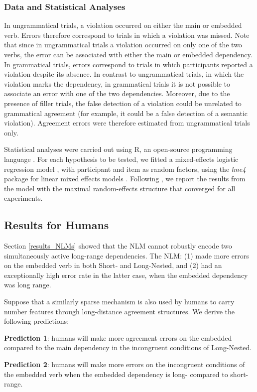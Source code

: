 \subsubsection{Data and Statistical Analyses}
In ungrammatical trials, a violation occurred on either the main or embedded verb. Errors therefore correspond to trials in which a violation was missed. Note that since in ungrammatical trials a violation occurred on only one of the two verbs, the error can be associated with either the main or embedded dependency. In grammatical trials, errors correspond to trials in which participants reported a violation despite its absence. In contrast to ungrammatical trials, in which the violation marks the dependency, in grammatical trials it is not possible to associate an error with one of the two dependencies. Moreover, due to the presence of filler trials, the false detection of a violation could be unrelated to grammatical agreement (for example, it could be a false detection of a semantic violation). Agreement errors were therefore estimated from ungrammatical trials only.

Statistical analyses were carried out using R, an open-source programming language \citep{team2013r}. For each hypothesis to be tested, we fitted a mixed-effects logistic regression model \citep{jaeger2008categorical}, with participant and item as random factors, using the \textit{lme4} package for linear mixed effects models \citep{bates2015lme4}. Following \citet{Baayen:etal:2008}, we report the results from the model with the maximal random-effects structure that converged for all experiments. 


\subsection{Results for Humans}
Section \ref{results_NLMs} showed that the NLM cannot robustly encode two simultaneously active long-range dependencies. The NLM: (1) made more errors on the embedded verb in both Short- and Long-Nested, and (2) had an exceptionally high error rate in the latter case, when the embedded dependency was long range.

Suppose that a similarly sparse mechanism is also used by humans to carry number features through long-distance agreement structures. We derive the following predictions:

\begin{APAitemize}
    \item \textbf{Prediction 1}: humans will make more agreement errors on the embedded compared to the main dependency in the incongruent conditions of Long-Nested. 
    \item \textbf{Prediction 2}: humans will make more errors on the incongruent conditions of the embedded verb when the embedded dependency is long- compared to short-range.
\end{APAitemize}

